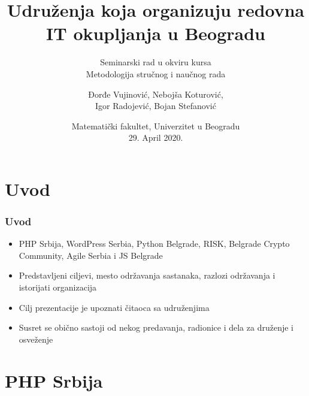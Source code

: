 \documentclass[hyperref={bookmarks=false},aspectratio=169]{beamer}
\title[]
{\bfseries{Udruženja koja organizuju redovna IT okupljanja u Beogradu}}
\subtitle{Seminarski rad u okviru kursa\\Metodologija stručnog i naučnog rada}
\author[]
{Đorđe Vujinović, Nebojša Koturović, \\Igor Radojević, Bojan Stefanović}
\date[ICUP, 2014]
{Matematički fakultet, Univerzitet u Beogradu\\29. April 2020.}
\begin{document}
\frame{\titlepage}  %


\section{Uvod}

\begin{frame}
\frametitle{Uvod}

\begin{itemize}
	\item PHP Srbija, WordPress Serbia, Python Belgrade, RISK, Belgrade Crypto Community, Agile Serbia i JS Belgrade
    \item Predstavljeni ciljevi, mesto održavanja sastanaka, razlozi održavanja i istorijati organizacija
    \item Cilj prezentacije je upoznati čitaoca sa udruženjima
    \item Susret se obično sastoji od nekog predavanja, radionice i dela za druženje i osveženje
\end{itemize}

\end{frame}

\section{PHP Srbija}
\end{document}
